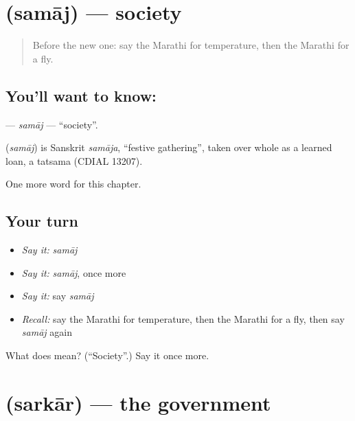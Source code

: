 \section[\texorpdfstring{\mr{समाज} (samāj)}{समाज (samāj)}]{ (samāj) — society}

\label{lesson:MR-C262-samaj}



\begin{quote}
Before the new one: say the Marathi for temperature, then the Marathi for a fly.
\end{quote}

\subsection*{You'll want to know: }
\textbf{} — \emph{samāj} — \textquotedblleft{}society\textquotedblright{}.

\begin{cousinweb}
\textbf{} (\emph{samāj}) is Sanskrit \emph{samāja}, \textquotedblleft{}festive gathering\textquotedblright{}, taken over whole as a learned loan, a tatsama (CDIAL 13207).
\end{cousinweb}

\begin{grammarlens}[title={What you've built}]
One more word for this chapter.
\end{grammarlens}

\subsection*{Your turn}
\begin{itemize}
\raggedright
  \item \emph{Say it:} \emph{samāj}
  \item \emph{Say it:} \emph{samāj}, once more
  \item \emph{Say it:} say \emph{samāj}
  \item \emph{Recall:} say the Marathi for temperature, then the Marathi for a fly, then say \emph{samāj} again
\end{itemize}

\begin{tcolorbox}[breakable,colback=teal!4,colframe=teal!35!black,title={Before you move on}]
What does  mean? (\textquotedblleft{}Society\textquotedblright{}.) Say it once more.
\end{tcolorbox}
\section[\texorpdfstring{\mr{सरकार} (sarkār)}{सरकार (sarkār)}]{ (sarkār) — the government}

